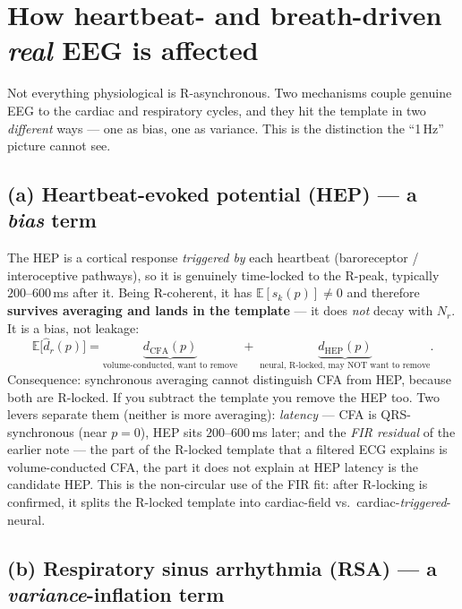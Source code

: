 \documentclass[11pt]{article}
\newcommand{\E}{\mathbb{E}}
\newcommand{\dhat}{\widehat{d}}
\begin{document}
\section{How heartbeat- and breath-driven \emph{real} EEG is affected}

Not everything physiological is R-asynchronous. Two mechanisms couple genuine EEG to the cardiac
and respiratory cycles, and they hit the template in two \emph{different} ways --- one as bias,
one as variance. This is the distinction the ``1\,Hz'' picture cannot see.

\subsection*{(a) Heartbeat-evoked potential (HEP) --- a \emph{bias} term}

The HEP is a cortical response \emph{triggered by} each heartbeat (baroreceptor / interoceptive
pathways), so it is genuinely time-locked to the R-peak, typically $200$--$600$\,ms after it.
Being R-coherent, it has $\E[s_k(p)]\neq 0$ and therefore \textbf{survives averaging and lands in
the template} --- it does \emph{not} decay with $N_r$. It is a bias, not leakage:
\begin{equation}
\E\bigl[\dhat_r(p)\bigr] = \underbrace{d_{\mathrm{CFA}}(p)}_{\text{volume-conducted, want to remove}}
\;+\; \underbrace{d_{\mathrm{HEP}}(p)}_{\text{neural, R-locked, may NOT want to remove}}.
\end{equation}
Consequence: synchronous averaging cannot distinguish CFA from HEP, because both are R-locked. If
you subtract the template you remove the HEP too. Two levers separate them (neither is more
averaging): \emph{latency} --- CFA is QRS-synchronous (near $p=0$), HEP sits $200$--$600$\,ms
later; and the \emph{FIR residual} of the earlier note --- the part of the R-locked template that
a filtered ECG explains is volume-conducted CFA, the part it does not explain at HEP latency is
the candidate HEP. This is the non-circular use of the FIR fit: after R-locking is confirmed, it
splits the R-locked template into cardiac-field vs.\ cardiac-\emph{triggered}-neural.

\subsection*{(b) Respiratory sinus arrhythmia (RSA) --- a \emph{variance}-inflation term}
\end{document}
